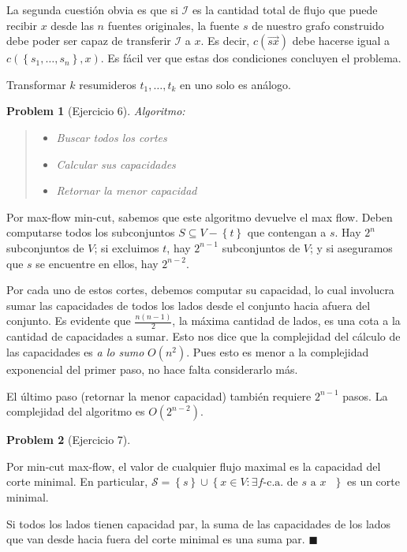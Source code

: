 \documentclass[a4paper, 12pt]{article}
\newtheorem{problem}{Problem}
\newtheorem{problem}{Problem}
\begin{document}
La segunda cuestión obvia es que si $\mathscr{I}$ es la cantidad total de flujo
que puede recibir $x$ desde las $n$ fuentes originales, la fuente $s$ de nuestro
grafo construido debe poder ser capaz de transferir $\mathscr{I}$ a $x$. Es
decir, $c(\overrightarrow{sx})$ debe hacerse igual a $c(\left\{ s_1, \ldots, s_n
\right\}, x )$. Es fácil ver que estas dos condiciones concluyen el problema. 

Transformar $k$ resumideros $t_1, \ldots, t_k$ en uno solo es análogo.

\begin{problem}[Ejercicio 6]
   Algoritmo: 

   
   \small
   \begin{quote}
   
   \begin{itemize}
       \item Buscar todos los cortes 
        \item Calcular sus capacidades 
        \item Retornar la menor capacidad
   \end{itemize}
   
   \end{quote}
   \normalsize
   

\end{problem}

Por max-flow min-cut, sabemos que este algoritmo devuelve el max flow. Deben
computarse todos los subconjuntos $S \subseteq V - \left\{ t \right\} $ que
contengan a $s$. Hay $2^{n}$ subconjuntos de $V$; si excluimos $t$, hay $2^{n -
1}$ subconjuntos de $V$; y si aseguramos que $s$ se encuentre en ellos, hay
$2^{n - 2}$.

Por cada uno de estos cortes, debemos computar su capacidad, lo cual involucra
sumar las capacidades de todos los lados desde el conjunto hacia afuera del
conjunto. Es evidente que $\frac{n(n-1)}{2}$, la máxima cantidad de lados, es
una cota a la cantidad de capacidades a sumar. Esto nos dice que la complejidad
del cálculo de las capacidades es \textit{a lo sumo} $O(n^2)$. Pues esto es
menor a la complejidad exponencial del primer paso, no hace falta considerarlo
más. 

El último paso (retornar la menor capacidad) también requiere $2^{n-1}$ pasos.
La complejidad del algoritmo es $O(2^{n-2})$.

\begin{problem}[Ejercicio 7]
    
\end{problem}

Por min-cut max-flow, el valor de cualquier flujo maximal es la capacidad del
corte minimal. En particular, $\mathcal{S} = \left\{ s \right\} \cup  \left\{ x
\in V : \exists f\text{-c.a.} \text{ de $s$ a $x$ }\right\} $ es un corte
minimal.

Si todos los lados tienen capacidad par, la suma de las
capacidades de los lados que van desde hacia fuera del corte minimal es una suma
par. $\blacksquare$
\end{document}
